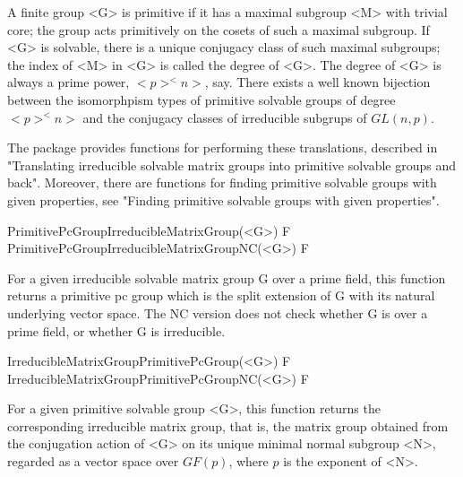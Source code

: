 


A finite group <G> is primitive if it has a maximal subgroup <M> with 
trivial core; the group acts primitively on the cosets of such
a maximal subgroup.  If <G> is solvable, there is a unique conjugacy class of 
such maximal subgroups; the index of <M> in <G> is called the degree of <G>.
The degree of <G> is always a prime power, $<p>^<n>$, say. There exists a well known
bijection between the isomorphpism types of primitive solvable groups of degree
$<p>^<n>$ and the conjugacy classes of irreducible subgrups of $GL(n, p)$.

The {\IRREDSOL} package provides functions for performing these translations,
described in "Translating irreducible solvable matrix groups into primitive
solvable groups and back". Moreover, there are functions for finding
primitive solvable groups with given properties, see "Finding primitive solvable groups
with given properties".




\>PrimitivePcGroupIrreducibleMatrixGroup(<G>) F
\>PrimitivePcGroupIrreducibleMatrixGroupNC(<G>) F

For a given irreducible solvable matrix group G over a prime field, this function
returns a primitive pc group which is the split extension of G with its natural
underlying vector space. The NC version does not check whether G is over a prime field, 
or whether G is irreducible.

\>IrreducibleMatrixGroupPrimitivePcGroup(<G>) F
\>IrreducibleMatrixGroupPrimitivePcGroupNC(<G>) F

For a given primitive solvable group <G>, this function returns the corresponding
irreducible matrix group, that is, the matrix group obtained from the conjugation
action of <G> on its unique minimal normal subgroup <N>, regarded as a vector 
space over $GF(p)$, where $p$ is the exponent of <N>.



